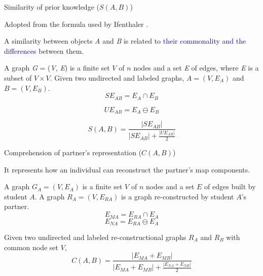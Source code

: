 \begin{frame}{Similarity of prior knowledge ($S(A, B)$)}
\begin{itemize}
    \item Adopted from the formula used by Ifenthaler \cite{Ifenthaler2010RelationalMaps,Lin1998AnSimilarity}.
    \item A similarity between objects \textit{A} and \textit{B} is related to \textcolor{blue}{their commonality and the differences} between them.
    
    {\footnotesize \item A graph \textit{G} = (\textit{V}, \textit{E}) is a finite set $V$ of $n$ nodes and a set \textit{E} of edges, where \textit{E} is a subset of $V \times V$. Given two undirected and labeled graphs, $A = (V, E_A)$ and $B = (V, E_B)$. \\
    \begin{equation}
      SE_{AB} = E_A \cap E_B 
    \end{equation}
    
    \begin{equation}
      UE_{AB} = E_A \ominus E_B 
    \end{equation}
    
    \begin{equation}
      S(A, B) = \frac{|SE_{AB}|}{{|SE_{AB}| + \frac{|UE_{AB}|}{2}}} 
    \end{equation}}
\end{itemize}
\end{frame}

\begin{frame}{Comprehension of partner's representation ($C(A, B)$)}
\begin{itemize}
    \item It represents how an individual can reconstruct the partner's map components.
    {\small \item A graph $G_A = (V, E_A)$ is a finite set $V$ of $n$ nodes and a set $E$ of edges built by student $A$. A graph $R_A = (V, E_{RA})$ is a graph re-constructed by student $A$'s partner. 
    \begin{equation}
        E_{MA} = E_{RA} \cap E_A 
    \end{equation}
    \begin{equation}
        E_{NA} = E_{RA} \ominus E_A
    \end{equation}
    \item Given two undirected and labeled re-constructional graphs $R_A$ and $R_B$ with common node set $V$, 
    \begin{equation}
        C(A, B) = \frac{|E_{MA} + E_{MB}|}{|E_{MA} + E_{MB}| + \frac{|E_{NA} + E_{NB}|}{2}} 
    \end{equation}}
\end{itemize}
\end{frame}

